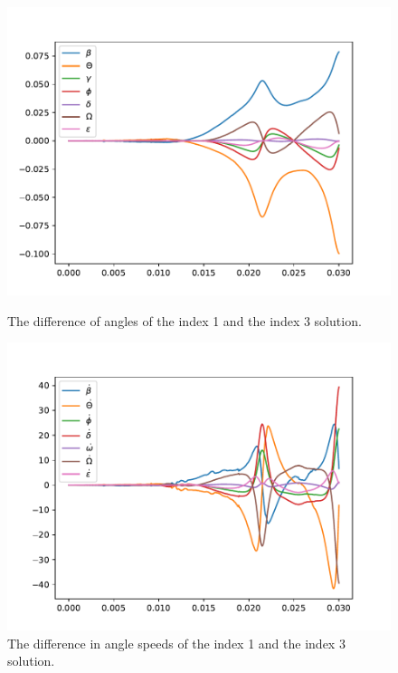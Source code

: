 \documentclass{report}
\begin{document}
\begin{figure}[h]
\centering
\begin{minipage}[t]{0.45\textwidth}
\centering
\includegraphics[width=\textwidth]{../Plots/Project2_main/Figure_530}
\caption{The difference of angles of the index 1 and the index 3 solution.}
\label{pl:indx1_solndiff_angles}
\end{minipage}
\hfill
\begin{minipage}[t]{0.45\textwidth}
\centering
\includegraphics[width=\textwidth]{../Plots/Project2_main/Figure_531}
\caption{The difference in angle speeds of the index 1 and the index 3 solution.}
\label{pl:indx1_solndiff_anglesdot}
\end{minipage}
\end{figure}
\end{document}
